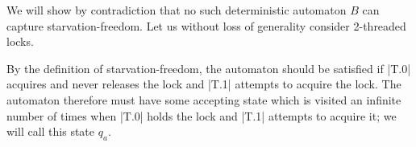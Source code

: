 


We will show by contradiction that no such deterministic automaton $B$ can capture starvation-freedom. Let us without loss of generality consider 2-threaded locks. 

By the definition of starvation-freedom, the automaton should be satisfied if |T.0| acquires and never releases the lock and |T.1| attempts to acquire the lock. The automaton therefore must have some accepting state which is visited an infinite number of times when |T.0| holds the lock and |T.1| attempts to acquire it; we will call this state $q_{a}$.



